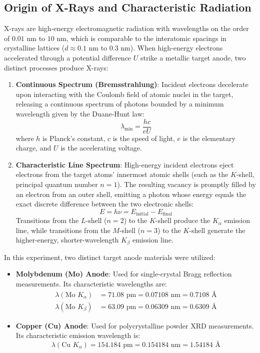 \documentclass[12pt,a4paper]{article}
\begin{document}
\subsection{Origin of X-Rays and Characteristic Radiation}
X-rays are high-energy electromagnetic radiation with wavelengths on the order of $0.01\text{ nm}$ to $10\text{ nm}$, which is comparable to the interatomic spacings in crystalline lattices ($d \approx 0.1\text{ nm to } 0.3\text{ nm}$). When high-energy electrons accelerated through a potential difference $U$ strike a metallic target anode, two distinct processes produce X-rays:
\begin{enumerate}
    \item \textbf{Continuous Spectrum (Bremsstrahlung)}: Incident electrons decelerate upon interacting with the Coulomb field of atomic nuclei in the target, releasing a continuous spectrum of photons bounded by a minimum wavelength given by the Duane-Hunt law:
    \begin{equation}
        \lambda_{\min} = \frac{hc}{eU}
    \end{equation}
    where $h$ is Planck's constant, $c$ is the speed of light, $e$ is the elementary charge, and $U$ is the accelerating voltage.
    \item \textbf{Characteristic Line Spectrum}: High-energy incident electrons eject electrons from the target atoms' innermost atomic shells (such as the $K$-shell, principal quantum number $n=1$). The resulting vacancy is promptly filled by an electron from an outer shell, emitting a photon whose energy equals the exact discrete difference between the two electronic shells:
    \begin{equation}
        E = h\nu = E_{\text{initial}} - E_{\text{final}}
    \end{equation}
    Transitions from the $L$-shell ($n=2$) to the $K$-shell produce the $K_\alpha$ emission line, while transitions from the $M$-shell ($n=3$) to the $K$-shell generate the higher-energy, shorter-wavelength $K_\beta$ emission line.
\end{enumerate}

In this experiment, two distinct target anode materials were utilized:
\begin{itemize}
    \item \textbf{Molybdenum (Mo) Anode}: Used for single-crystal Bragg reflection measurements. Its characteristic wavelengths are:
    \begin{align}
        \lambda(\text{Mo } K_\alpha) &= 71.08\text{ pm} = 0.07108\text{ nm} = 0.7108\text{ \AA} \\
        \lambda(\text{Mo } K_\beta) &= 63.09\text{ pm} = 0.06309\text{ nm} = 0.6309\text{ \AA}
    \end{align}
    \item \textbf{Copper (Cu) Anode}: Used for polycrystalline powder XRD measurements. Its characteristic emission wavelength is:
    \begin{equation}
        \lambda(\text{Cu } K_\alpha) = 154.184\text{ pm} = 0.154184\text{ nm} = 1.54184\text{ \AA}
    \end{equation}
\end{itemize}
\end{document}
